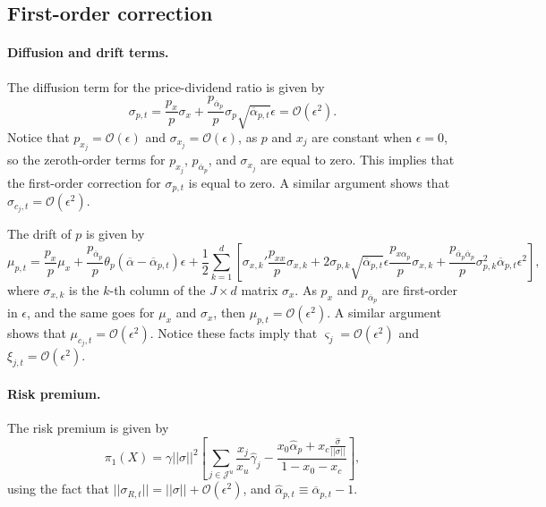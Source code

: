 \subsection{First-order correction}

\paragraph{Diffusion and drift terms.} The diffusion term for the price-dividend ratio is given by
\begin{equation}
    \sigma_{p,t} = \frac{p_{x}}{p} \sigma_{x} + \frac{p_{\overline{\alpha}_p}}{p} \sigma_{p} \sqrt{\overline{\alpha}_{p,t}} \epsilon = \mathcal{O}(\epsilon^2).
\end{equation}
Notice that $p_{x_j} = \mathcal{O}(\epsilon)$ and $\sigma_{x_j} = \mathcal{O}(\epsilon)$, as $p$ and $x_j$ are constant when $\epsilon = 0$, so the zeroth-order terms for $p_{x_j}$, $p_{\overline{\alpha}_p}$, and $\sigma_{x_j}$ are equal to zero. This implies that the first-order correction for $\sigma_{p,t}$ is equal to zero. A similar argument shows that $\sigma_{c_j,t} = \mathcal{O}(\epsilon^2)$. 

The drift of $p$ is given by 
\begin{equation}
    \mu_{p,t} = \frac{p_{x}}{p} \mu_{x} + \frac{p_{\overline{\alpha}_p}}{p} \theta_{p} (\overline{\alpha} -\overline{\alpha}_{p,t}) \epsilon + \frac{1}{2} \sum_{k=1}^d\left[  \sigma_{x,k}'\frac{ p_{xx}}{p} \sigma_{x,k} + 2 \sigma_{p,k} \sqrt{\overline{\alpha}_{p,t}} \epsilon \frac{ p_{x\alpha_p}}{p} \sigma_{x,k} + \frac{p_{\overline{\alpha}_p\overline{\alpha}_p}}{p} \sigma_{p,k}^2 \overline{\alpha}_{p,t} \epsilon^2 \right],
\end{equation}
where $\sigma_{x,k}$ is the $k$-th column of the $J\times d$ matrix $\sigma_x$. As $p_{x}$ and $p_{\overline{\alpha}_p}$ are first-order in $\epsilon$, and the same goes for $\mu_x$ and $\sigma_x$, then $\mu_{p,t} = \mathcal{O}(\epsilon^2)$. A similar argument shows that $\mu_{c_j,t} = \mathcal{O}(\epsilon^2)$. Notice these facts imply that $\varsigma_j = \mathcal{O}(\epsilon^2)$ and $\xi_{j,t} = \mathcal{O}(\epsilon^2)$.

\paragraph{Risk premium.} The risk premium is given by 
\begin{equation}
    \pi_1(X) =  \gamma ||\sigma||^2 \left[  \sum_{j\in \mathcal{J}^u} \frac{x_{j}}{x_u} \hat{\gamma}_j -  \frac{x_0 \hat{\alpha}_{p} + x_c \frac{\hat{\sigma}}{||\sigma||}}{1-x_0 - x_c}\right],
\end{equation}
using the fact that $||\sigma_{R,t}|| = ||\sigma|| + \mathcal{O}(\epsilon^2)$, and $\hat{\alpha}_{p,t} \equiv \overline{\alpha}_{p,t}-1$.

